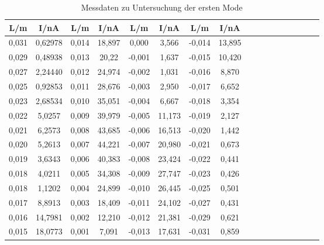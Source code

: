 \begin{table}[h!]
  \centering
  \caption{Messdaten zu Untersuchung der ersten Mode}
  \label{tab:erstemode}
  \begin{tabular}{c c c c c c c c c c c c c c c c c}
    \toprule
      L/m & I/nA & L/m & I/nA & L/m & I/nA & L/m & I/nA \\
      \midrule
       0,031  &  0,62978 & 0,014  &  18,897  &  0,000   &  3,566  & -0,014  &  13,895  \\
       0,029  &  0,48938 & 0,013  &  20,22   &  -0,001  &  1,637  & -0,015  &  10,420  \\
       0,027  &  2,24440 & 0,012  &  24,974  &  -0,002  &  1,031  & -0,016  &  8,870   \\
       0,025  &  0,92853 & 0,011  &  28,676  &  -0,003  &  2,950  & -0,017  &  6,652   \\
       0,023  &  2,68534 & 0,010  &  35,051  &  -0,004  &  6,667  & -0,018  &  3,354   \\
       0,022  &  5,0257  & 0,009  &  39,979  &  -0,005  &  11,173 & -0,019  &  2,127   \\
       0,021  &  6,2573  & 0,008  &  43,685  &  -0,006  &  16,513 & -0,020  &  1,442   \\
       0,020  &  5,2613  & 0,007  &  44,221  &  -0,007  &  20,980 & -0,021  &  0,673   \\
       0,019  &  3,6343  & 0,006  &  40,383  &  -0,008  &  23,424 & -0,022  &  0,441   \\
       0,018  &  4,0211  & 0,005  &  34,308  &  -0,009  &  27,747 & -0,023  &  0,426   \\
       0,018  &  1,1202  & 0,004  &  24,899  &  -0,010  &  26,445 & -0,025  &  0,501   \\
       0,017  &  8,8913  & 0,003  &  18,409  &  -0,011  &  24,102 & -0,027  &  0,431   \\
       0,016  &  14,7981 & 0,002  &  12,210  &  -0,012  &  21,381 & -0,029  &  0,621   \\
       0,015  &  18,0773 & 0,001  &  7,091   &  -0,013  &  17,631 & -0,031  &  0,859   \\

    \bottomrule
  \end{tabular}
\end{table}

%
